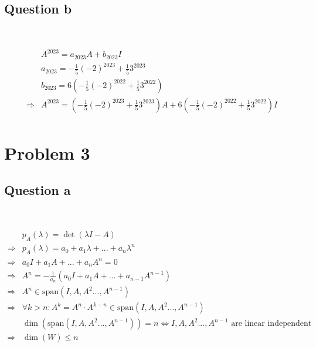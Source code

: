 \documentclass{article}
\begin{document}
\subsection{Question b}

~

\begin{equation*}
    \begin{split}
        &A^{2023}=a_{2023}A+b_{2023}I\\
        &a_{2023}=-\frac{1}{5}(-2)^{2023}+\frac{1}{5}3^{2023}\\
        &b_{2023}=6(-\frac{1}{5}(-2)^{2022}+\frac{1}{5}3^{2022})\\
        \Rightarrow&A^{2023}=(-\frac{1}{5}(-2)^{2023}+\frac{1}{5}3^{2023})A+6(-\frac{1}{5}(-2)^{2022}+\frac{1}{5}3^{2022})I\\
    \end{split}
\end{equation*}

\newpage

\section{Problem 3}

\subsection{Question a}

~

\begin{equation*}
    \begin{split}
        &p_A(\lambda)=\det(\lambda I-A)\\
        \Rightarrow&p_A(\lambda)=a_0+a_1\lambda+...+a_n\lambda^n\\
        \Rightarrow&a_0 I+a_1A+...+a_nA^n=0\\
        \Rightarrow&A^n=-\frac{1}{a_n}(a_0I+a_1A+...+a_{n-1}A^{n-1})\\
        \Rightarrow&A^n\in \text{span}(I,A,A^2...,A^{n-1})\\
        \Rightarrow&\forall k>n: A^k=A^n\cdot A^{k-n}\in \text{span}(I,A,A^2...,A^{n-1})\\
        &\dim(\text{span}(I,A,A^2...,A^{n-1}))=n\Leftrightarrow I,A,A^2...,A^{n-1}\text{ are linear independent}\\
        \Rightarrow&\dim(W)\leq n
    \end{split}
\end{equation*}
\end{document}
